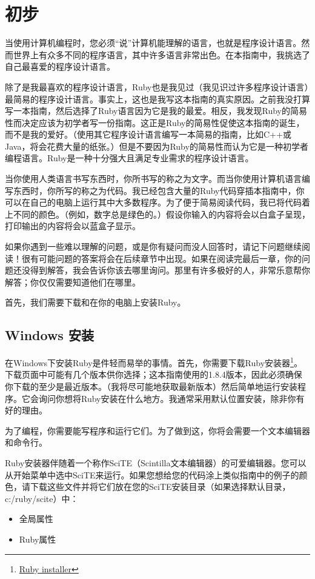 \chapter{初步}

当使用计算机编程时，您必须“说”计算机能理解的语言，也就是程序设计语言。然而世界上有众多不同的程序语言，其中许多语言非常出色。在本指南中，我挑选了自己最喜爱的程序设计语言。

除了是我最喜欢的程序设计语言，Ruby也是我见过（我见识过许多程序设计语言）最简易的程序设计语言。事实上，这也是我写这本指南的真实原因。之前我没打算写一本指南，然后选择了Ruby语言因为它是我的最爱。相反，我发现Ruby的简易性而决定应该为初学者写一份指南。这正是Ruby的简易性促使这本指南的诞生，而不是我的爱好。（使用其它程序设计语言编写一本简易的指南，比如C++或Java，将会花费大量的纸张。）但是不要因为Ruby的简易性而认为它是一种初学者编程语言。Ruby是一种十分强大且满足专业需求的程序设计语言。

当你使用人类语言书写东西时，你所书写的称之为文字。而当你使用计算机语言编写东西时，你所写的称之为代码。我已经包含大量的Ruby代码穿插本指南中，你可以在自己的电脑上运行其中大多数程序。为了便于简易阅读代码，我已将代码着上不同的颜色。（例如，数字总是绿色的。）假设你输入的内容将会以白盒子呈现，打印输出的内容将会以蓝盒子显示。

如果你遇到一些难以理解的问题，或是你有疑问而没人回答时，请记下问题继续阅读！很有可能问题的答案将会在后续章节中出现。如果在阅读完最后一章，你的问题还没得到解答，我会告诉你该去哪里询问。那里有许多极好的人，非常乐意帮你解答；你仅仅需要知道他们在哪里。

首先，我们需要下载和在你的电脑上安装Ruby。

\section{Windows 安装}

在Windows下安装Ruby是件轻而易举的事情。首先，你需要下载Ruby安装器\footnote{\href{http://rubyinstaller.rubyforge.org/}{Ruby installer}}。下载页面中可能有几个版本供你选择；这本指南使用的1.8.4版本，因此必须确保你下载的至少是最近版本。（我将尽可能地获取最新版本）然后简单地运行安装程序。它会询问你想将Ruby安装在什么地方。我通常采用默认位置安装，除非你有好的理由。

为了编程，你需要能写程序和运行它们。为了做到这，你将会需要一个文本编辑器和命令行。

Ruby安装器伴随着一个称作SciTE（Scintilla文本编辑器）的可爱编辑器。您可以从开始菜单中选中SciTE来运行。如果您想给您的代码涂上类似指南中的例子的颜色，请下载这些文件并将它们放在您的SciTE安装目录（如果选择默认目录，c:/ruby/scite）中：
\begin{itemize}
\item 全局属性
\item Ruby属性
\end{itemize}

